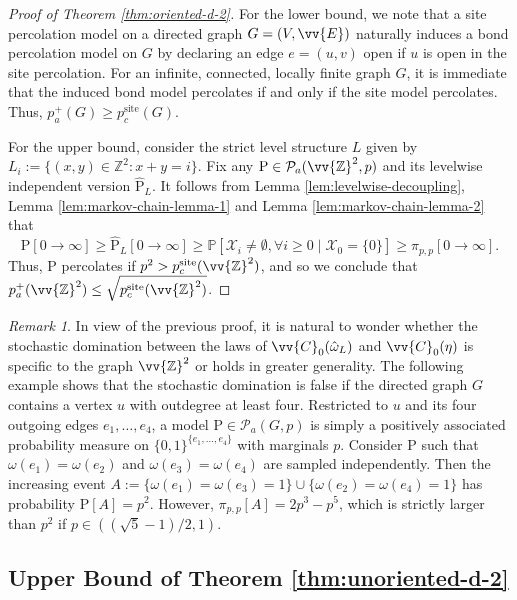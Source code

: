 \documentclass[11pt]{article}
\renewcommand{\P}{\mathrm{P}}
\newcommand{\Z}{\mathbb{Z}}
\theoremstyle{remark}
\newtheorem{remark}{Remark}
\begin{document}
\begin{proof}[Proof of Theorem \ref{thm:oriented-d-2}]
	For the lower bound, we note that a site percolation model on a directed graph $G=(V,\vv{E})$ naturally induces a bond percolation model on $G$ by declaring an edge $e=(u,v)$ open if $u$ is open in the site percolation. For an infinite, connected, locally finite graph $G$, it is immediate that the induced bond model percolates if and only if the site model percolates. Thus, $p_a^+(G) \ge p_c^{\mathrm{site}}(G)$.
	
	For the upper bound, consider the strict level structure $L$ given by $L_i := \{(x,y) \in \Z^2 : x+y=i\}$. Fix any $\P \in \mathcal{P}_a(\vv{\Z}^2,p)$ and its levelwise independent version $\hat{\P}_L$. It follows from Lemma \ref{lem:levelwise-decoupling}, Lemma \ref{lem:markov-chain-lemma-1} and Lemma \ref{lem:markov-chain-lemma-2} that
	\begin{equation}
		\P[0 \rightarrow \infty] \ge \hat{\P}_L[0\rightarrow \infty] \ge \mathbb P[\mathcal{X}_i \neq \emptyset, \forall i\ge 0 \mid \mathcal{X}_0 = \{0\}] \ge \pi_{p,p}[0 \rightarrow \infty].
	\end{equation}
	Thus, $\P$ percolates if $p^2 > p_c^{\mathrm{site}}(\vv{\Z}^2)$, and so we conclude that $p_a^+(\vv{\Z}^2) \le \sqrt{p_c^{\mathrm{site}}(\vv{\Z}^2)}$.
\end{proof}

\begin{remark}
    In view of the previous proof, it is natural to wonder whether the stochastic domination between the laws of $\vv{C}_0(\hat{\omega}_L)$ and $\vv{C}_0(\eta)$ is specific to the graph $\vv{\Z}^2$ or holds in greater generality. The following example shows that the stochastic domination is false if the directed graph $G$ contains a vertex $u$ with outdegree at least four. Restricted to $u$ and its four outgoing edges $e_1,\ldots,e_4$, a model $\P \in \mathcal P_a(G,p)$ is simply a positively associated probability measure on $\{0,1\}^{\{e_1,\ldots,e_4\}}$ with marginals $p$. Consider $\P$ such that $\omega(e_1)=\omega(e_2)$ and $\omega(e_3)=\omega(e_4)$ are sampled independently. Then the increasing event $A := \{\omega(e_1)=\omega(e_3)=1\} \cup \{\omega(e_2)=\omega(e_4)=1\}$ has probability $\P[A]=p^2$. However, $\pi_{p,p}[A] = 2p^3 - p^5$, which is strictly larger than $p^2$ if $p \in ((\sqrt{5}-1)/2,1)$.
\end{remark}

\subsection{Upper Bound of Theorem \ref{thm:unoriented-d-2}}
\label{subsec:upper-bound-unoriented-2-d}
\end{document}
